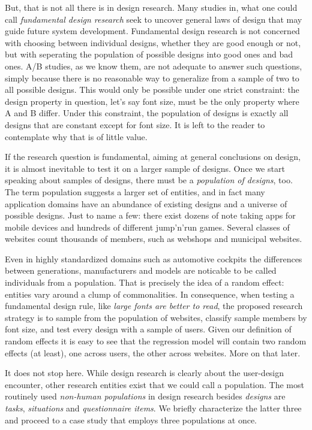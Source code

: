 \documentclass[]{svmono}
\begin{document}
But, that is not all there is in design research. Many studies in, what
one could call \emph{fundamental design research} seek to uncover
general laws of design that may guide future system development.
Fundamental design research is not concerned with choosing between
individual designs, whether they are good enough or not, but with
seperating the population of possible designs into good ones and bad
ones. A/B studies, as we know them, are not adequate to answer such
questions, simply because there is no reasonable way to generalize from
a sample of two to all possible designs. This would only be possible
under one strict constraint: the design property in question, let's say
font size, must be the only property where A and B differ. Under this
constraint, the population of designs is exactly all designs that are
constant except for font size. It is left to the reader to contemplate
why that is of little value.

If the research question is fundamental, aiming at general conclusions
on design, it is almost inevitable to test it on a larger sample of
designs. Once we start speaking about samples of designs, there must be
a \emph{population of designs}, too. The term population suggests a
larger set of entities, and in fact many application domains have an
abundance of existing designs and a universe of possible designs. Just
to name a few: there exist dozens of note taking apps for mobile devices
and hundreds of different jump'n'run games. Several classes of websites
count thousands of members, such as webshops and municipal websites.

Even in highly standardized domains such as automotive cockpits the
differences between generations, manufacturers and models are noticable
to be called individuals from a population. That is precisely the idea
of a random effect: entities vary around a clump of commonalities. In
consequence, when testing a fundamental design rule, like \emph{large
fonts are better to read}, the proposed research strategy is to sample
from the population of websites, classify sample members by font size,
and test every design with a sample of users. Given our definition of
random effects it is easy to see that the regression model will contain
two random effects (at least), one across users, the other across
websites. More on that later.

It does not stop here. While design research is clearly about the
user-design encounter, other research entities exist that we could call
a population. The most routinely used \emph{non-human populations} in
design research besides \emph{designs} are \emph{tasks},
\emph{situations} and \emph{questionnaire items}. We briefly
characterize the latter three and proceed to a case study that employs
three populations at once.
\end{document}
